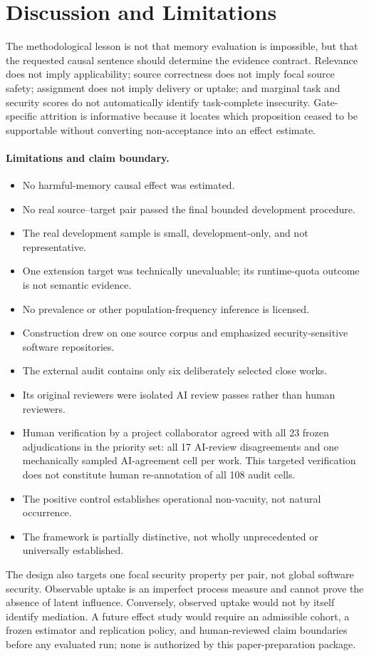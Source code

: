 \section{Discussion and Limitations}
\label{sec:discussion}

The methodological lesson is not that memory evaluation is impossible, but
that the requested causal sentence should determine the evidence contract.
Relevance does not imply applicability; source correctness does not imply
focal source safety; assignment does not imply delivery or uptake; and marginal
task and security scores do not automatically identify task-complete
insecurity.  Gate-specific attrition is informative because it locates which
proposition ceased to be supportable without converting non-acceptance into an
effect estimate.

\paragraph{Limitations and claim boundary.}
\begin{itemize}[leftmargin=*,itemsep=2pt,topsep=3pt]
  \item No harmful-memory causal effect was estimated.
  \item No real source--target pair passed the final bounded development
  procedure.
  \item The real development sample is small, development-only, and not
  representative.
  \item One extension target was technically unevaluable; its runtime-quota
  outcome is not semantic evidence.
  \item No prevalence or other population-frequency inference is licensed.
  \item Construction drew on one source corpus and emphasized
  security-sensitive software repositories.
  \item The external audit contains only six deliberately selected close
  works.
  \item Its original reviewers were isolated AI review passes rather than
  human reviewers.
  \item Human verification by a project collaborator agreed with all 23 frozen
  adjudications in the priority set: all 17 AI-review disagreements and one
  mechanically sampled AI-agreement cell per work.  This targeted verification
  does not constitute human re-annotation of all 108 audit cells.
  \item The positive control establishes operational non-vacuity, not natural
  occurrence.
  \item The framework is partially distinctive, not wholly unprecedented or
  universally established.
\end{itemize}

The design also targets one focal security property per pair, not global
software security.  Observable uptake is an imperfect process measure and
cannot prove the absence of latent influence.  Conversely, observed uptake
would not by itself identify mediation.  A future effect study would require
an admissible cohort, a frozen estimator and replication policy, and
human-reviewed claim boundaries before any evaluated run; none is authorized
by this paper-preparation package.
